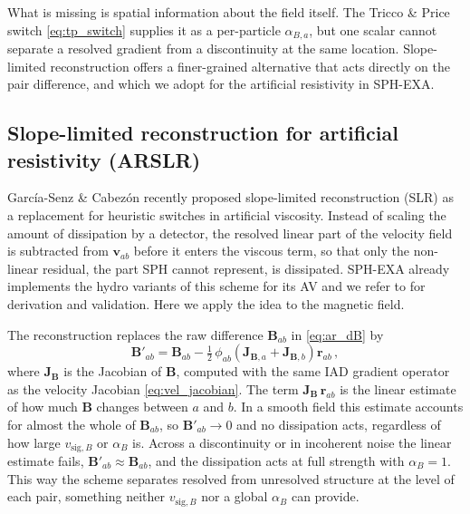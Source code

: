 What is missing is spatial information about the field itself. The Tricco \& Price switch \eqref{eq:tp_switch} supplies it as a per-particle $\alpha_{B,a}$, but one scalar cannot separate a resolved gradient from a discontinuity at the same location. Slope-limited reconstruction offers a finer-grained alternative that acts directly on the pair difference, and which we adopt for the artificial resistivity in SPH-EXA.


\subsection{Slope-limited reconstruction for artificial resistivity (ARSLR)}
\label{sec:slr}

García-Senz \& Cabezón \cite{GarciaSenzCabezon2026} recently proposed slope-limited reconstruction (SLR) as a replacement for heuristic switches in artificial viscosity. Instead of scaling the amount of dissipation by a detector, the resolved linear part of the velocity field is subtracted from $\mathbf{v}_{ab}$ before it enters the viscous term, so that only the non-linear residual, the part SPH cannot represent, is dissipated. SPH-EXA already implements the hydro variants of this scheme for its AV and we refer to \cite{GarciaSenzCabezon2026} for derivation and validation. Here we apply the idea to the magnetic field.

The reconstruction replaces the raw difference $\mathbf{B}_{ab}$ in \eqref{eq:ar_dB} by
\begin{equation}
    \mathbf{B}'_{ab} = \mathbf{B}_{ab} - \tfrac{1}{2}\,\phi_{ab}\left(\mathbf{J}_{\mathbf{B},a} + \mathbf{J}_{\mathbf{B},b}\right)\mathbf{r}_{ab}\,,
    \label{eq:slr_B}
\end{equation}
where $\mathbf{J}_{\mathbf{B}}$ is the Jacobian of $\mathbf{B}$, computed with the same IAD gradient operator as the velocity Jacobian \eqref{eq:vel_jacobian}. The term $\mathbf{J}_\mathbf{B}\,\mathbf{r}_{ab}$ is the linear estimate of how much $\mathbf{B}$ changes between $a$ and $b$. In a smooth field this estimate accounts for almost the whole of $\mathbf{B}_{ab}$, so $\mathbf{B}'_{ab} \to 0$ and no dissipation acts, regardless of how large $v_{\mathrm{sig},B}$ or $\alpha_B$ is. Across a discontinuity or in incoherent noise the linear estimate fails, $\mathbf{B}'_{ab} \approx \mathbf{B}_{ab}$, and the dissipation acts at full strength with $\alpha_B = 1$. This way the scheme separates resolved from unresolved structure at the level of each pair, something neither $v_{\mathrm{sig},B}$ nor a global $\alpha_B$ can provide.

